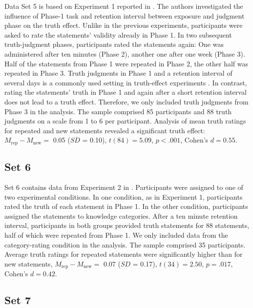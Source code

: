 \documentclass[
  english,
  ,man,floatsintext]{apa6}
\begin{document}
\begin{appendix}
Data Set 5 is based on Experiment 1 reported in
\textcite{nadarevic2014}. The authors investigated the influence of
Phase-1 task and retention interval between exposure and judgment phase
on the truth effect. Unlike in the previous experiments, participants
were asked to rate the statements' validity already in Phase 1. In two
subsequent truth-judgment phases, participants rated the statements
again: One was administered after ten minutes (Phase 2), another one
after one week (Phase 3). Half of the statements from Phase 1 were
repeated in Phase 2, the other half was repeated in Phase 3. Truth
judgments in Phase 1 and a retention interval of several days is a
commonly used setting in truth-effect experiments
\autocite[e.g.,][]{hasher1977}. In contrast, rating the statements'
truth in Phase 1 and again after a short retention interval does not
lead to a truth effect. Therefore, we only included truth judgments from
Phase 3 in the analysis. The sample comprised 85 participants and 88
truth judgments on a scale from 1 to 6 per participant. Analysis of mean
truth ratings for repeated and new statements revealed a significant
truth effect: \(M_\text{rep} - M_\text{new} =\) 0.05 (\(SD\) = 0.10),
\(t(84) = 5.09\), \(p < .001\), Cohen's \(d = 0.55\).

\hypertarget{set-6}{%
\subsection{Set 6}\label{set-6}}

Set 6 contains data from Experiment 2 in \textcite{nadarevic2014}.
Participants were assigned to one of two experimental conditions. In one
condition, as in Experiment 1, participants rated the truth of each
statement in Phase 1. In the other condition, participants assigned the
statements to knowledge categories. After a ten minute retention
interval, participants in both groups provided truth statements for 88
statements, half of which were repeated from Phase 1. We only included
data from the category-rating condition in the analysis. The sample
comprised 35 participants. Average truth ratings for repeated statements
were significantly higher than for new statements,
\(M_\text{rep} - M_\text{new} =\) 0.07 (\(SD\) = 0.17),
\(t(34) = 2.50\), \(p = .017\), Cohen's \(d = 0.42\).

\hypertarget{set-7}{%
\subsection{Set 7}\label{set-7}}


\end{appendix}
\end{document}
